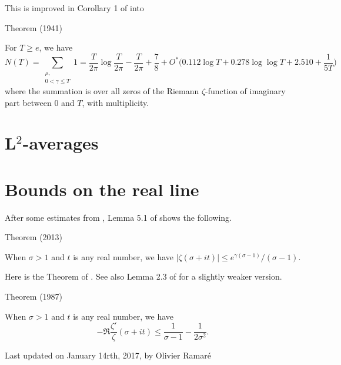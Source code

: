 This is improved in Corollary 1 of
\cite{Trudgian*13}
into
\begin{thm}{Theorem (1941)}

For $T\ge e$, we have
$$
N(T)=\sum_{\substack{\rho,\\ 0 < \gamma\le T}} 1=
            \frac{T}{2\pi}\log\frac{T}{2\pi}-\frac{T}{2\pi}+\frac{7}{8}
            +O^*\bigl(0.112\log T+0.278\log\log T+2.510+\frac{1}{5T}
            \bigr)
            $$
            where the summation is over all zeros of the Riemann
            $\zeta$-function of
            imaginary part between 0 and $T$, with multiplicity.
\end{thm}







\section{L${}^2$-averages
}



\section{Bounds on the real line
}


After some estimates
from \cite{Bastion-Rogalaski*02}, 
Lemma 5.1 of \cite{Ramare*13d} shows
the following.

\begin{thm}{Theorem (2013)}

  When $\sigma> 1$ and $t$ is any real number, we have $|\zeta(\sigma+it)|\le   e^{\gamma(\sigma-1) }/(\sigma-1)$.
\end{thm}


Here is the Theorem of
\cite{Delange*87}.
See also Lemma 2.3 of
\cite{Ford*01} for a
slightly weaker version.

\begin{thm}{Theorem (1987)}

  When $\sigma> 1$ and $t$ is any real number, we have
  $$
  -\Re\frac{\zeta'}{\zeta}(\sigma+it)\le
  \frac{1}{\sigma-1}-\frac{1}{2\sigma^2}.
  $$ 
\end{thm}








  
  Last updated on January 14rth, 2017, by Olivier Ramar\'e
















